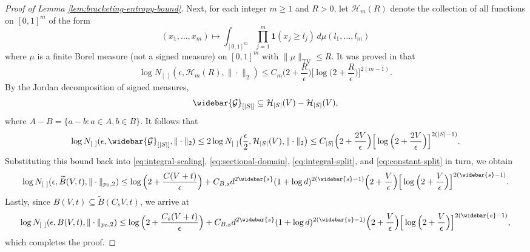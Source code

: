 \documentclass[10pt]{article}
\newcommand{\G}{{\mathcal{G}}}
\newcommand{\ind}{{\mathbf{1}}}
\begin{document}
\begin{proof}[Proof of Lemma \ref{lem:bracketing-entropy-bound}]
Next, for each integer $m \ge 1$ and $R > 0$, let $\mathcal{H}_m(R)$ denote the 
collection of all functions on $[0, 1]^m$ of the form
\begin{equation*}
    (x_1, \dots, x_m) \mapsto \int_{[0, 1]^m} \prod_{j = 1}^m \ind(x_j \ge l_j) 
    \, d\mu(l_1, \dots, l_m)
\end{equation*}
where $\mu$ is a finite Borel measure (not a signed measure) on $[0, 1]^m$ with 
$\|\mu\|_{\text{TV}} \le R$. It was proved in \citet[Theorem 1.1]{gao2013bracketing} 
that
\begin{equation*}
    \log N_{[ \ ]}(\epsilon, \mathcal{H}_m(R), \| \cdot \|_2) 
    \le C_m \Big(2 + \frac{R}{\epsilon}\Big) 
    \Big[\log\Big(2 + \frac{R}{\epsilon}\Big)\Big]^{2(m - 1)}.
\end{equation*}
By the Jordan decomposition of signed measures, 
\begin{equation*}
    \widebar{\G}_{[|S|]} \subseteq 
    \mathcal{H}_{|S|}(V) - \mathcal{H}_{|S|}(V),
\end{equation*}
where $A - B = \{a - b: a \in A, b \in B\}$. It follows that
\begin{equation*}
    \log N_{[ \ ]}(\epsilon, \widebar{\G}_{[|S|]}, \| \cdot \|_2) 
    \le 2 \log N_{[ \ ]}\big(\frac{\epsilon}{2}, 
    \mathcal{H}_{|S|}(V), \| \cdot \|_2\big) 
    \le C_{|S|} \Big(2 + \frac{2V}{\epsilon} \Big) 
    \Big[\log\Big(2 + \frac{2V}{\epsilon}\Big)\Big]^{2(|S| - 1)}.
\end{equation*}
Substituting this bound back into \eqref{eq:integral-scaling}, 
\eqref{eq:sectional-domain}, \eqref{eq:integral-split}, and
\eqref{eq:constant-split} in turn, we obtain
\begin{equation*}
    \log N_{[ \ ]}(\epsilon, \widetilde{B}(V, t), \| \cdot \|_{p_0, 2}) 
    \le \log\Big(2 + \frac{C(V + t)}{\epsilon}\Big) 
    + C_{B, s} d^{2\widebar{s}}(1 + \log d)^{2(\widebar{s} - 1)}
    \Big(2 + \frac{V}{\epsilon}\Big) 
    \Big[\log\Big(2 + \frac{V}{\epsilon}\Big)\Big]^{2(\widebar{s} - 1)}.
\end{equation*}
Lastly, since $B(V, t) \subseteq \widetilde{B}(C_s V, t)$, we arrive at
\begin{equation*}
    \log N_{[ \ ]}(\epsilon, B(V, t), \| \cdot \|_{p_0, 2}) 
    \le \log\Big(2 + \frac{C_s(V + t)}{\epsilon}\Big) 
    + C_{B, s} d^{2\widebar{s}}(1 + \log d)^{2(\widebar{s} - 1)}
    \Big(2 + \frac{V}{\epsilon}\Big) 
    \Big[\log\Big(2 + \frac{V}{\epsilon}\Big)\Big]^{2(\widebar{s} - 1)},
\end{equation*}
which completes the proof.
\end{proof}
\end{document}
